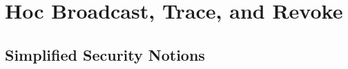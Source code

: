\section{\Ad Hoc Broadcast, Trace, and Revoke}\label{sec:ahbtr-definitions}





\subsection{Simplified Security Notions}\label{sec:ahbtr-simplified-security}








